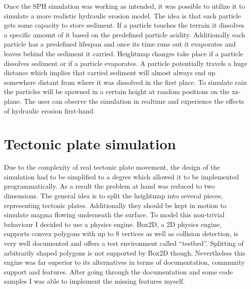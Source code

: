 \documentclass[11pt,a4paper,twoside,openright]{report}
\begin{document}
Once the SPH simulation was working as intended, it was possible to utilize it to simulate a more realistic hydraulic erosion model. The idea is that each particle gets some capacity to store sediment. If a particle touches the terrain it dissolves a specific amount of it based on the predefined particle acidity. Additionally each particle has a predefined lifespan and once its time runs out it evaporates and leaves behind the sediment it carried. Heightmap changes take place if a particle dissolves sediment or if a particle evaporates. A particle potentially travels a huge distance which implies that carried sediment will almost always end up somewhere distant from where it was dissolved in the first place. To simulate rain the particles will be spawned in a certain height at random positions on the xz-plane. The user can observe the simulation in realtime and experience the effects of hydraulic erosion first-hand.

\section{Tectonic plate simulation}
Due to the complexity of real tectonic plate movement, the design of the simulation had to be simplified to a degree which allowed it to be implemented programmatically. As a result the problem at hand was reduced to two dimensions. The general idea is to split the heightmap into several pieces, representing tectonic plates. Additionally they should be kept in motion to simulate magma flowing underneath the surface. To model this non-trivial behaviour I decided to use a physics engine. Box2D, a 2D physics engine, supports convex polygons with up to 8 vertices as well as collision detection, is very well documented and offers a test environment called ``testbed''. Splitting of arbitrarily shaped polygons is not supported by Box2D though. Nevertheless this engine was far superior to its alternatives in terms of documentation, community support and features. After going through the documentation and some code samples I was able to implement the missing features myself.
\end{document}
